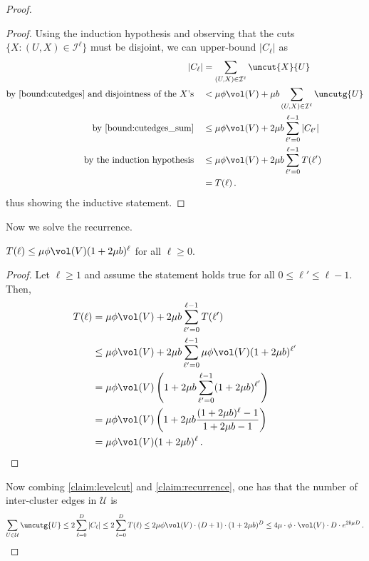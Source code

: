 \begin{proof}
\begin{proof}
	Using the induction hypothesis and observing that the cuts $\{X : (U,X) \in \mathcal{I}^\ell\}$ must be disjoint, we can upper-bound $|C_\ell|$ as
	\begin{align*}
		|C_\ell| & = \sum_{(U,X) \in \mathcal{I}^\ell}\uncut{X}{U} \\
		\text{by~\eqref{bound:cutedges} and disjointness of the $X$'s}\quad & < \mu \phi \vol(V) + \mu  b \sum_{(U,X) \in \mathcal{I}^\ell} \uncutg{U}\\
		\text{by~\eqref{bound:cutedges_sum}}\quad & \le \mu\phi \vol(V) + 2 \mu  b \sum_{\ell' =0}^{\ell-1} |C_{\ell'}| \\
		\text{by the induction hypothesis}\quad & \le \mu\phi \vol(V) + 2 \mu b \sum_{\ell' =0}^{\ell-1} T(\ell') \\
		& = T(\ell)\, .
	\end{align*}
	thus showing the inductive statement.
\end{proof}
\noindent
Now we solve the recurrence.
\begin{claim}
	\label{claim:recurrence}
	$T(\ell) \le \mu \phi \vol(V) (1+2\mu b)^\ell$ for all $\ell \ge 0$.
\end{claim}
\begin{proof}
	Let $\ell\ge 1$ and assume the statement holds true for all $0\le \ell'\le \ell-1$. Then,
		\begin{align*}
		T(\ell) & = \mu\phi \vol(V) + 2\mu b \sum_{\ell'=0}^{\ell-1} T(\ell') \\
		& \le \mu\phi \vol(V) + 2\mu b \sum_{\ell'=0}^{\ell-1} \mu \phi \vol(V) (1+2\mu b)^{\ell'} \\
		& = \mu\phi \vol(V) \left(1+2\mu b\sum_{\ell'=0}^{\ell-1} (1+2\mu b)^{\ell'}\right) \\
		& = \mu\phi \vol(V) \left(1+2\mu b \frac{(1+2\mu b)^{\ell}-1}{1+2\mu b-1}\right) \\
		& = \mu\phi \vol(V) (1+2\mu b)^{\ell} \, .
	\end{align*}
\end{proof}
	\noindent
	 Now combing \cref{claim:levelcut} and \cref{claim:recurrence}, one has that the number of inter-cluster edges in $\mathcal{U}$ is
	\begin{align*}
		\sum_{U \in \mathcal{U}} \uncutg{U} \le 2 \sum_{\ell=0}^{D} |C_\ell| \le 2 \sum_{\ell=0}^{D} T(\ell) \le 2 \mu\phi \vol(V)\cdot (D+1) \cdot (1+2\mu b)^{D} \le 4 \mu \cdot \phi \cdot \vol(V) \cdot D \cdot  e^{2b\mu D}\, .
	\end{align*}
\end{proof}

